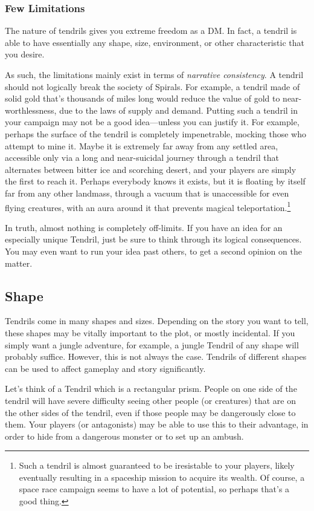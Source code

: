 \begin{multicols*}{2}
\subsubsection*{Few Limitations}
The nature of tendrils gives you extreme freedom as a DM.
In fact, a tendril is able to have essentially any shape, size, environment, or other characteristic that you desire.

As such, the limitations mainly exist in terms of \textit{narrative consistency}.
A tendril should not logically break the society of Spirals.
For example, a tendril made of solid gold that's thousands of miles long would reduce the value of gold to near-worthlessness, due to the laws of supply and demand.
Putting such a tendril in your campaign may not be a good idea---unless you can justify it.
For example, perhaps the surface of the tendril is completely impenetrable, mocking those who attempt to mine it.
Maybe it is extremely far away from any settled area, accessible only via a long and near-suicidal journey through a tendril that alternates between bitter ice and scorching desert, and your players are simply the first to reach it.
Perhaps everybody knows it exists, but it is floating by itself far from any other landmass, through a vacuum that is unaccessible for even flying creatures, with an aura around it that prevents magical teleportation.\footnote{Such a tendril is almost guaranteed to be iresistable to your players, likely eventually resulting in a spaceship mission to acquire its wealth. Of course, a space race campaign seems to have a lot of potential, so perhaps that's a good thing.}

In truth, almost nothing is completely off-limits.
If you have an idea for an especially unique Tendril, just be sure to think through its logical consequences.
You may even want to run your idea past others, to get a second opinion on the matter.

\subsection{Shape}
Tendrils come in many shapes and sizes.
Depending on the story you want to tell, these shapes may be vitally important to the plot, or mostly incidental.
If you simply want a jungle adventure, for example, a jungle Tendril of any shape will probably suffice.
However, this is not always the case.
Tendrils of different shapes can be used to affect gameplay and story significantly.

Let's think of a Tendril which is a rectangular prism.
People on one side of the tendril will have severe difficulty seeing other people (or creatures) that are on the other sides of the tendril, even if those people may be dangerously close to them.
Your players (or antagonists) may be able to use this to their advantage, in order to hide from a dangerous monster or to set up an ambush.



\end{multicols*}

